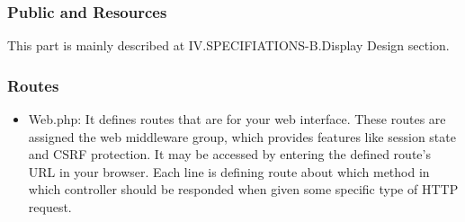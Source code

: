 \documentclass[letterpaper, 10 pt, conference]{ieeeconf}  %
\begin{document}
\begin{center}
\end{center}
\subsubsection{Public and Resources\\}
This part is mainly described at IV.SPECIFIATIONS-B.Display Design section.



\begin{center}
\end{center}

\subsubsection{Routes}
\begin{itemize}
    \item Web.php: It defines routes that are for your web interface. These routes are assigned the web middleware group, which provides features like session state and CSRF protection. It may be accessed by entering the defined route's URL in your browser. Each line is defining route about which method in which controller should be responded when given some specific type of  HTTP request.\\
\end{itemize}
\end{document}
